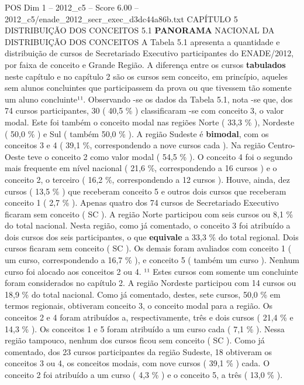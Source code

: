 \begin{textsample}{POS Dim 1 – 2012\_c5 – Score 6.00 – 2012\_c5/enade\_2012\_secr\_exec\_d3dc44a86b.txt}  \label{ex:f1_pos_114}
CAPÍTULO 5 DISTRIBUIÇÃO DOS CONCEITOS 5.1 \textbf{PANORAMA} NACIONAL DA DISTRIBUIÇÃO DOS CONCEITOS A Tabela 5.1 apresenta a quantidade e distribuição de cursos de Secretariado Executivo participantes do ENADE/2012, por faixa de conceito e Grande Região.
A diferença entre os cursos \textbf{tabulados} neste capítulo e no capítulo 2 são os cursos sem conceito, em princípio, aqueles sem alunos concluintes que participassem da prova ou que tivessem tão somente um aluno concluinte¹¹.
Observando -se os dados da Tabela 5.1, nota -se que, dos 74 cursos participantes, 30 ( 40,5 \% ) classificaram -se com conceito 3, o valor modal.
Este foi também o conceito modal nas regiões Norte ( 33,3 \% ), Nordeste ( 50,0 \% ) e Sul ( também 50,0 \% ).
A região Sudeste é \textbf{bimodal}, com os conceitos 3 e 4 ( 39,1 \%, correspondendo a nove cursos cada ).
Na região Centro-Oeste teve o conceito 2 como valor modal ( 54,5 \% ).
O conceito 4 foi o segundo mais frequente em nível nacional ( 21,6 \%, correspondendo a 16 cursos ) e o conceito 2, o terceiro ( 16,2 \%, correspondendo a 12 cursos ).
Houve, ainda, dez cursos ( 13,5 \% ) que receberam conceito 5 e outros dois cursos que receberam conceito 1 ( 2,7 \% ).
Apenas quatro dos 74 cursos de Secretariado Executivo ficaram sem conceito ( SC ).
A região Norte participou com seis cursos ou 8,1 \% do total nacional.
Nesta região, como já comentado, o conceito 3 foi atribuído a dois cursos dos seis participantes, o que \textbf{equivale} a 33,3 \% do total regional.
Dois cursos ficaram sem conceito ( SC ).
Os demais foram avaliados com conceito 1 ( um curso, correspondendo a 16,7 \% ), e conceito 5 ( também um curso ).
Nenhum curso foi alocado aos conceitos 2 ou 4. ¹¹ Estes cursos com somente um concluinte foram considerados no capítulo 2.
A região Nordeste participou com 14 cursos ou 18,9 \% do total nacional.
Como já comentado, destes, sete cursos, 50,0 \% em termos regionais, obtiveram conceito 3, o conceito modal para a região.
Os conceitos 2 e 4 foram atribuídos a, respectivamente, três e dois cursos ( 21,4 \% e 14,3 \% ).
Os conceitos 1 e 5 foram atribuído a um curso cada ( 7,1 \% ).
Nessa região tampouco, nenhum dos cursos ficou sem conceito ( SC ).
Como já comentado, dos 23 cursos participantes da região Sudeste, 18 obtiveram os conceitos 3 ou 4, os conceitos modais, com nove cursos ( 39,1 \% ) cada.
O conceito 2 foi atribuído a um curso ( 4,3 \% ) e o conceito 5, a três ( 13,0 \% ).

\end{textsample}
